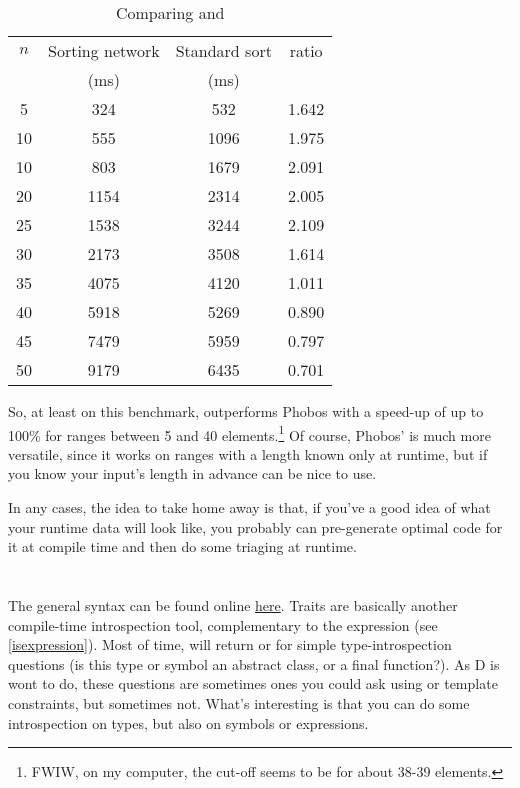 \begin{table}[htb]
\centering
\begin{tabular}[c]{|c|c|c|c|}
\hline
$n$ & Sorting network & Standard sort & ratio \\
    & (ms)            & (ms)          &       \\ \hline \hline
5  & 324  & 532  & 1.642 \\ \hline
10 & 555  & 1096 & 1.975 \\ \hline
10 & 803  & 1679 & 2.091 \\ \hline
20 & 1154 & 2314 & 2.005 \\ \hline
25 & 1538 & 3244 & 2.109 \\ \hline
30 & 2173 & 3508 & 1.614 \\ \hline
35 & 4075 & 4120 & 1.011 \\ \hline
40 & 5918 & 5269 & 0.890 \\ \hline
45 & 7479 & 5959 & 0.797 \\ \hline
50 & 9179 & 6435 & 0.701 \\ \hline
\end{tabular}
\caption{Comparing  and }
\label{table:sortingnetworkperformance}
\end{table}

So, at least on this benchmark,  outperforms Phobos with a speed-up of up to 100\% for ranges between 5 and 40 elements.\footnote{ FWIW, on my computer, the cut-off seems to be for about 38-39 elements.} Of course, Phobos'  is much more versatile, since it works on ranges with a length known only at runtime, but if you know your input's length in advance  can be nice to use.

In any cases, the idea to take home away is that, if you've a good idea of what your runtime data will look like, you probably can pre-generate optimal code for it at compile time and then do some triaging at runtime.

\section{}\label{traits}

The general  syntax can be found online \href{www.dlang.org/traits.html}{here}. Traits are basically another compile-time introspection tool, complementary to the  expression (see  \autoref{isexpression}). Most of time,  will return  or  for simple type-introspection questions (is this type or symbol an abstract class, or a final function?). As D is wont to do, these questions are sometimes ones you could ask using  or template constraints, but sometimes not. What's interesting is that you can do some introspection on types, but also on symbols or expressions.

